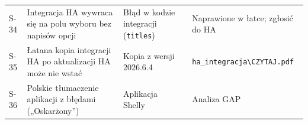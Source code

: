 \documentclass[11pt,a4paper]{article}
\begin{document}
\begin{longtable}{>{\raggedright\arraybackslash}p{3.00cm}>{\raggedright\arraybackslash}p{4.04cm}>{\raggedright\arraybackslash}p{2.99cm}>{\raggedright\arraybackslash}p{0.81cm}>{\raggedright\arraybackslash}p{3.56cm}}
S-34 & Integracja HA wywraca się na polu wyboru bez napisów opcji & Błąd w kodzie integracji (\texttt{titles}) & \leavevmode{\symbolfont\color{apamber}\textbf{◐}} & Naprawione w łatce; zgłosić do HA \\
S-35 & Łatana kopia integracji HA po aktualizacji HA może nie wstać & Kopia z wersji 2026.6.4 & \leavevmode{\symbolfont\color{apamber}\textbf{◐}} & \texttt{ha\_\allowbreak{}integracja\textbackslash{}CZYTAJ.\allowbreak{}pdf} \\
S-36 & Polskie tłumaczenie aplikacji z błędami („Oskarżony”) & Aplikacja Shelly & \leavevmode{\symbolfont\color{apred}\textbf{✘}} & Analiza GAP \\
\end{longtable}
\end{document}
